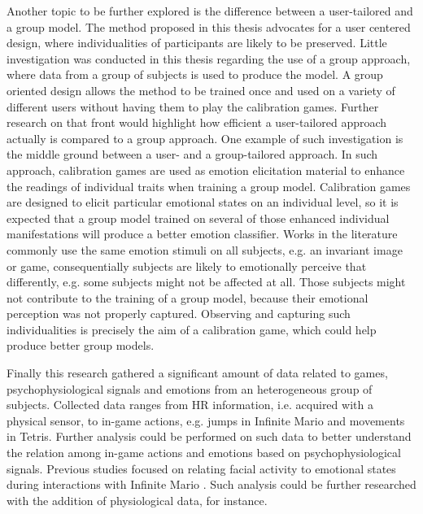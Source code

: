 Another topic to be further explored is the difference between a user-tailored and a group model. The method proposed in this thesis advocates for a user centered design, where individualities of participants are likely to be preserved. Little investigation was conducted in this thesis regarding the use of a group approach, where data from a group of subjects is used to produce the model. A group oriented design allows the method to be trained once and used on a variety of different users without having them to play the calibration games. Further research on that front would highlight how efficient a user-tailored approach actually is compared to a group approach. One example of such investigation is the middle ground between a user- and a group-tailored approach. In such approach, calibration games are used as emotion elicitation material to enhance the readings of individual traits when training a group model. Calibration games are designed to elicit particular emotional states on an individual level, so it is expected that a group model trained on several of those enhanced individual manifestations will produce a better emotion classifier. Works in the literature commonly use the same emotion stimuli on all subjects, e.g. an invariant image or game, consequentially subjects are likely to emotionally perceive that differently, e.g. some subjects might not be affected at all. Those subjects might not contribute to the training of a group model, because their emotional perception was not properly captured. Observing and capturing such individualities is precisely the aim of a calibration game, which could help produce better group models.

Finally this research gathered a significant amount of data related to games, psychophysiological signals and emotions from an heterogeneous group of subjects. Collected data ranges from HR information, i.e. acquired with a physical sensor, to in-game actions, e.g. jumps in Infinite Mario and movements in Tetris. Further analysis could be performed on such data to better understand the relation among in-game actions and emotions based on psychophysiological signals. Previous studies focused on relating facial activity to emotional states during interactions with Infinite Mario \parencite{shaker2011feature}. Such analysis could be further researched with the addition of physiological data, for instance.
